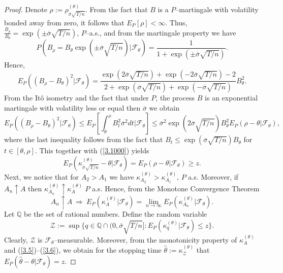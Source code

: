 \documentclass{amsart}
\numberwithin{equation}{section}
\begin{document}
\begin{proof}
Denote
$\rho:=\rho^{(\theta)}_{\overline{\sigma}\sqrt{T/n}}$.
From the fact that $B$ is a $P$--martingale with volatility bonded away from zero, it follows that
$E_P[\rho]<\infty$. Thus, $\frac{B_{\rho}}{B_{\theta}}=\exp(\pm \overline{\sigma}\sqrt{T/n})$, $P$--a.s.,
and from the martingale property we have
\begin{equation*}
P\left( B_{\rho}= B_{\theta}\exp(\pm\overline{\sigma}\sqrt{T/n})|\mathcal F_{\theta}\right)=
\frac{1}{1+\exp(\pm \overline{\sigma}\sqrt{T/n})}.
\end{equation*}
Hence,
\begin{equation}\label{3.1000}
E_{P}\left((B_{\rho}-B_{\theta})^2|\mathcal F_{\theta}\right)=
\frac{\exp(2\overline{\sigma}\sqrt{T/n})+
\exp(-2\overline{\sigma}\sqrt{T/n})-2}{2+\exp(\overline{\sigma}\sqrt{T/n})+
\exp(-\overline{\sigma}\sqrt{T/n})}B^2_{\theta}.
\end{equation}
From
 the It\^{o} isometry and the fact that under $P$, the process $B$ is an
 exponential martingale with volatility less or equal then $\overline{\sigma}$ we
 obtain
 $$E_{P}\left((B_{\rho}-B_{\theta})^2|\mathcal F_{\theta}\right)\leq E_P\left[\int_{\theta}^{\rho} B^2_t\overline{\sigma}^2 dt|\mathcal F_{\theta}\right]\leq
\overline{\sigma}^2\exp( 2\overline{\sigma}\sqrt{T/n})  B^2_{\theta}E_{P}(\rho-\theta|\mathcal F_{\theta}),$$
 where the last inequality follows from the fact that $B_t\leq \exp(\overline{\sigma}\sqrt{T/n}) B_{\theta}$ for $t\in [\theta,\rho]$.
This together with (\ref{3.1000}) yields
\begin{equation}\label{3.5}
E_{P}(\kappa^{(\theta)}_{\overline{\sigma}\sqrt{T/n}}-\theta|\mathcal F_{\theta})=E_{P}(\rho-\theta|\mathcal F_{\theta})\geq z.
\end{equation}
Next, we notice that for $A_2>A_1$ we have $\kappa^{(\theta)}_{A_2}>\kappa^{(\theta)}_{A_1}$, $P$ a.s.
Moreover, if $A_n\uparrow A$ then
$\kappa^{(\theta)}_{A_n}\uparrow \kappa^{(\theta)}_A$ $P$ a.s.
Hence, from the Monotone Convergence Theorem
\begin{equation}\label{3.6}
 A_n\uparrow A \  \Rightarrow  \
E_{P}(\kappa^{(\theta)}_A|\mathcal F_{\theta})=\lim_{n\rightarrow\infty}E_{P}(\kappa^{(\theta)}_{A_n}|\mathcal F_{\theta}).
\end{equation}
Let $\mathbb Q$ be the set of rational numbers. Define the random variable
\[\mathcal Z:=\sup\{q\in\mathbb Q\cap (0, \overline{\sigma}\sqrt{T/n}]:E_{P}(\kappa^{(\theta)}_q|\mathcal F_{\theta})\leq z \}.\]
Clearly, $\mathcal Z$ is $\mathcal F_{\theta}$--measurable.
Moreover, from the monotonicity property of $\kappa^{(\theta)}_A$ and (\ref{3.5})--(\ref{3.6}), we obtain for the stopping time
$\hat\theta:=\kappa^{(\theta)}_{\mathcal Z}$
that
$E_{P}(\hat\theta-\theta|\mathcal F_{\theta})=z.$


\end{proof}
\end{document}
